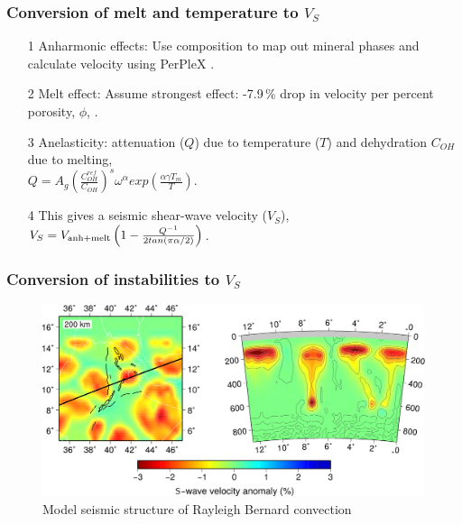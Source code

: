 \documentclass[aspectratio=169]{beamer}
\begin{document}
\begin{frame}
\frametitle{Conversion of melt and temperature to $V_{S}$}
    \begin{itemize}
    \item[1]{Anharmonic effects: Use composition to map out mineral phases and calculate velocity using PerPleX \citep{connolly-2005}.}
    \item[2]{Melt effect: Assume strongest effect: -7.9\,\% drop in velocity per percent porosity, $\phi$, \citep{hammond-2000}.}
    \item[3]{Anelasticity: attenuation ($Q$) due to temperature ($T$) and dehydration {$C_{OH}$} due to melting, \\ $Q = A_{g}\left(\frac{C^{ref}_{OH}}{C_{OH}}\right)^{s}\omega^{\alpha} exp \left(\frac{\alpha\gamma T_{m}}{T} \right)$.}
    \item[4]{This gives a seismic shear-wave velocity ($V_{S}$), \\ $V_{S} = V_{\rm anh+melt} \left(1 - \frac{Q^{-1}}{2tan(\pi\alpha/2)}\right)$.}
    \end{itemize}
\end{frame}

\begin{frame}
    \frametitle{Conversion of instabilities to $V_{S}$}
    \begin{figure}
        \includegraphics[width=0.85\paperwidth]{./figures/Newt200/input.png}
        \caption{Model seismic structure of Rayleigh Bernard convection}
    \end{figure}
\end{frame}
\end{document}

